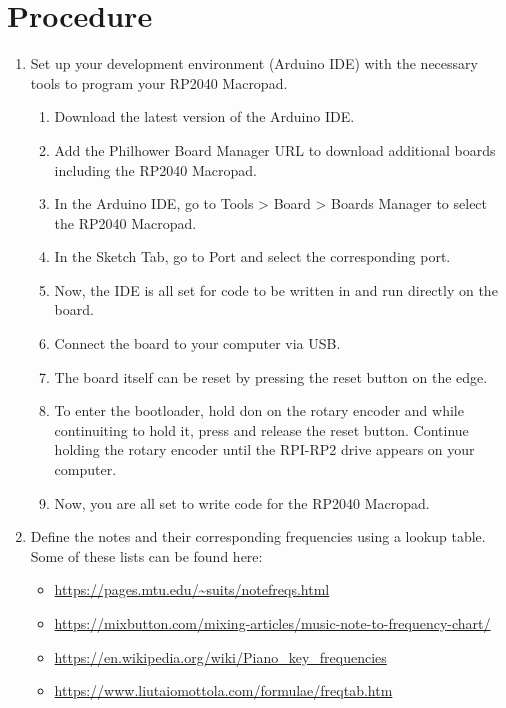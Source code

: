 \documentclass{article}
\begin{document}
\section{Procedure}


\begin{enumerate}
    \item Set up your development environment (Arduino IDE) with the necessary tools to program your RP2040 Macropad.
    \begin{enumerate}
        \item Download the latest version of the Arduino IDE.
        \item Add the Philhower Board Manager URL to download additional boards including the RP2040 Macropad.
        \item In the Arduino IDE, go to Tools \textgreater{} Board \textgreater{} Boards Manager to select the RP2040 Macropad. 
        \item In the Sketch Tab, go to Port and select the corresponding port. 
        \item Now, the IDE is all set for code to be written in and run directly on the board.
        \item Connect the board to your computer via USB.
        \item The board itself can  be reset by pressing the reset button on the edge.
        \item To enter the bootloader, hold don on the rotary encoder and while continuiting to hold it, press and release the reset button. Continue holding the rotary encoder until the RPI-RP2 drive appears on your computer. 
        \item Now, you are all set to write code for the RP2040 Macropad. 
    \end{enumerate}

    \item Define the notes and their corresponding frequencies using a lookup table. Some of these lists can be found here:
    \begin{itemize}
        \item \url{https://pages.mtu.edu/~suits/notefreqs.html}
        \item \url{https://mixbutton.com/mixing-articles/music-note-to-frequency-chart/}
        \item \url{https://en.wikipedia.org/wiki/Piano_key_frequencies}
        \item \url{https://www.liutaiomottola.com/formulae/freqtab.htm}
    \end{itemize}
    

\end{enumerate}
\end{document}
